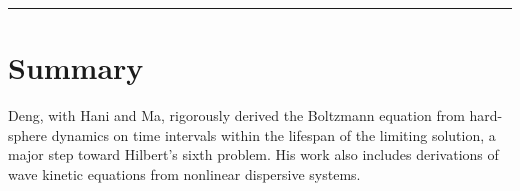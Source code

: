 \begin{center}\rule{0.5\linewidth}{0.5pt}\end{center}

\section*{Summary}

Deng, with Hani and Ma, rigorously derived the Boltzmann equation from hard-sphere dynamics on time intervals within the lifespan of the limiting solution, a major step toward Hilbert's sixth problem. His work also includes derivations of wave kinetic equations from nonlinear dispersive systems.
